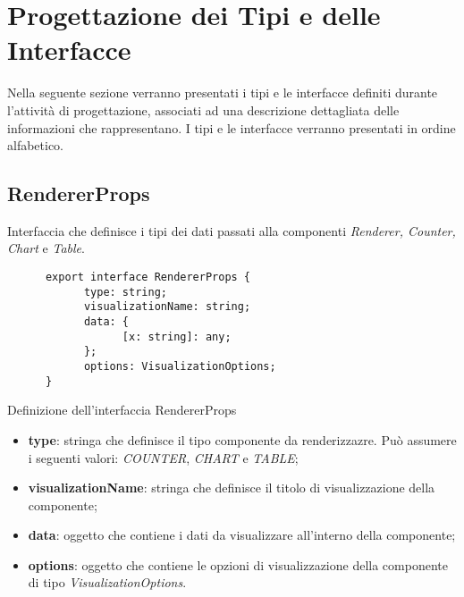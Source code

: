 \section{Progettazione dei Tipi e delle Interfacce}
Nella seguente sezione verranno presentati i tipi e le interfacce definiti durante l'attività di progettazione, associati ad una descrizione dettagliata
delle informazioni che rappresentano. \newline
I tipi e le interfacce verranno presentati in ordine alfabetico.

\subsection{RendererProps}
Interfaccia che definisce i tipi dei dati passati alla componenti \textit{Renderer, Counter, Chart} e \textit{Table}.
\begin{listing}[H]
      \begin{verbatim}
      export interface RendererProps {
            type: string;
            visualizationName: string;
            data: {
                  [x: string]: any;
            };
            options: VisualizationOptions;
      }
      \end{verbatim}
      \caption{Definizione dell'interfaccia RendererProps}
      \label{listing:rendererProps}
\end{listing}
\begin{itemize}
      \item \textbf{type}: stringa che definisce il tipo componente da renderizzazre. Può assumere i seguenti valori: \textit{COUNTER}, \textit{CHART} e \textit{TABLE};
      \item \textbf{visualizationName}: stringa che definisce il titolo di visualizzazione della componente;
      \item \textbf{data}: oggetto che contiene i dati da visualizzare all'interno della componente;
      \item \textbf{options}: oggetto che contiene le opzioni di visualizzazione della componente di tipo \textit{VisualizationOptions}.
\end{itemize}

